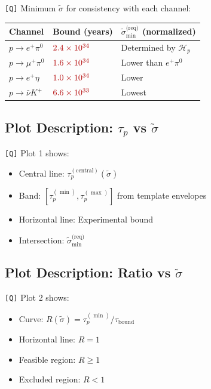\documentclass[11pt,a4paper]{article}
\newcommand{\Qval}[1]{\textcolor{red!70!black}{#1}}
\newcommand{\tagQ}{\textcolor{red!70!black}{\texttt{[Q]}}}
\theoremstyle{definition}
\begin{document}
\tagQ{} Minimum $\tilde{\sigma}$ for consistency with each channel:

\begin{center}
\begin{tabular}{lll}
\toprule
Channel & Bound (years) & $\tilde{\sigma}_{\min}^{\text{(req)}}$ (normalized) \\
\midrule
$p \to e^+ \pi^0$ & $\Qval{2.4 \times 10^{34}}$ & Determined by $\mathcal{H}_p$ \\
$p \to \mu^+ \pi^0$ & $\Qval{1.6 \times 10^{34}}$ & Lower than $e^+\pi^0$ \\
$p \to e^+ \eta$ & $\Qval{1.0 \times 10^{34}}$ & Lower \\
$p \to \bar{\nu} K^+$ & $\Qval{6.6 \times 10^{33}}$ & Lowest \\
\bottomrule
\end{tabular}
\end{center}

\subsection{Plot Description: $\tau_p$ vs $\tilde{\sigma}$}
\label{app:plot1-desc}

\tagQ{} Plot 1 shows:
\begin{itemize}
  \item Central line: $\tau_p^{(\text{central})}(\tilde{\sigma})$
  \item Band: $[\tau_p^{(\min)}, \tau_p^{(\max)}]$ from template envelopes
  \item Horizontal line: Experimental bound
  \item Intersection: $\tilde{\sigma}_{\min}^{\text{(req)}}$
\end{itemize}

\subsection{Plot Description: Ratio vs $\tilde{\sigma}$}
\label{app:plot2-desc}

\tagQ{} Plot 2 shows:
\begin{itemize}
  \item Curve: $R(\tilde{\sigma}) = \tau_p^{(\min)}/\tau_{\text{bound}}$
  \item Horizontal line: $R = 1$
  \item Feasible region: $R \geq 1$
  \item Excluded region: $R < 1$
\end{itemize}
\end{document}
